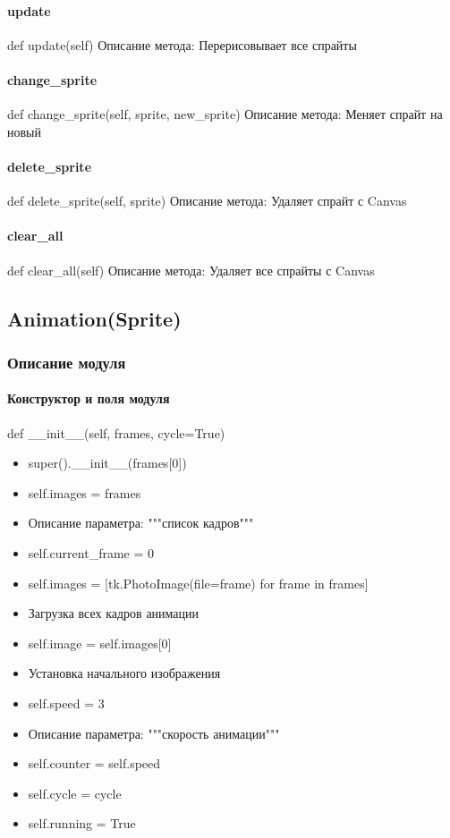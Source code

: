 \paragraph{update}
def update(self)
Описание метода: Перерисовывает все спрайты
\paragraph{change\_sprite}
def change\_sprite(self, sprite, new\_sprite)
Описание метода: Меняет  спрайт на новый
\paragraph{delete\_sprite}
def delete\_sprite(self, sprite)
Описание метода: Удаляет спрайт с Canvas
\paragraph{clear\_all}
def clear\_all(self)
Описание метода: Удаляет все спрайты с Canvas

\subsection{Animation(Sprite)}
\subsubsection{Описание модуля}
\paragraph{Конструктор и поля модуля}
def \_\_init\_\_(self, frames, cycle=True)
\begin{itemize}
	\item super().\_\_init\_\_(frames[0])
	\item self.images = frames
	\item Описание параметра: """список кадров"""
	\item self.current\_frame = 0
	\item self.images = [tk.PhotoImage(file=frame) for frame in frames]   
	\item Загрузка всех кадров анимации
	\item self.image = self.images[0]
	\item Установка начального изображения
	\item self.speed = 3
	\item Описание параметра: """скорость анимации"""
	\item self.counter = self.speed
	\item self.cycle = cycle
	\item self.running = True
	
\end{itemize}
